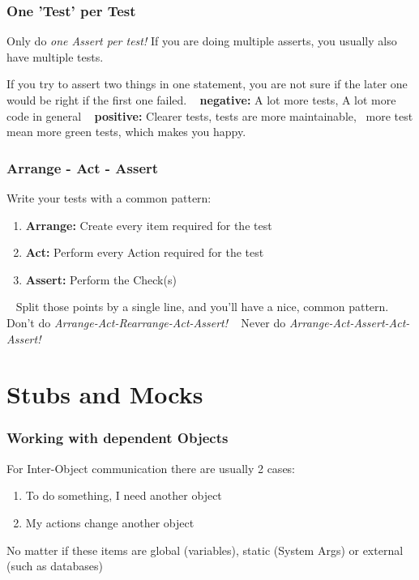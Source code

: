 \documentclass[12pt]{beamer}
\begin{document}
	\begin{frame}
		\frametitle{One 'Test' per Test}
		Only do \textit{one Assert per test!} \newline
		If you are doing multiple asserts, you usually also have multiple tests. 
		
		If you try to assert two things in one statement, you are not sure if the later one would be right if the first one failed.
		~\newline
		\textbf{negative:} A lot more tests, A lot more code in general
		~\newline
		\textbf{positive:} Clearer tests, tests are more maintainable, ~\newline more test mean more green tests, which makes you happy. 
	\end{frame}
	
	\begin{frame}
		\frametitle{Arrange - Act - Assert}
		Write your tests with a common pattern: 
		\begin{enumerate}
			\item \textbf{Arrange:} Create every item required for the test
			\item \textbf{Act:} Perform every Action required for the test
			\item \textbf{Assert:} Perform the Check(s)
		\end{enumerate}
		~\newline
		Split those points by a single line, and you'll have a nice, common pattern. \newline
		Don't do \textit{Arrange-Act-Rearrange-Act-Assert!} ~\newline
		Never do \textit{Arrange-Act-Assert-Act-Assert!}
	\end{frame}
	
	\section{Stubs and Mocks}
	
	\begin{frame}
		\frametitle{Working with dependent Objects}
		For Inter-Object communication there are usually 2 cases:
		\begin{enumerate}
			\item To do something, I need another object
			\item My actions change another object
		\end{enumerate}
		No matter if these items are global (variables), static (System Args) or external (such as databases) 
	\end{frame}
\end{document}
